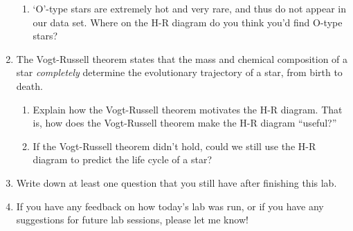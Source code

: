 \documentclass[11pt]{article}
\begin{document}
\begin{enumerate}
\begin{enumerate}
        \item `O'-type stars are extremely hot and very rare, and thus do not appear in our data set. Where on the H-R diagram do you think you'd find O-type stars?
    \end{enumerate}
    
    \item The Vogt-Russell theorem states that the mass and chemical composition of a star \emph{completely} determine the evolutionary trajectory of a star, from birth to death. 
    \begin{enumerate}
        \item Explain how the Vogt-Russell theorem motivates the H-R diagram. That is, how does the Vogt-Russell theorem make the H-R diagram ``useful?''
        
        \item If the Vogt-Russell theorem didn't hold, could we still use the H-R diagram to predict the life cycle of a star?
    \end{enumerate}
    
    \item Write down at least one question that you still have after finishing this lab.
    
    \item If you have any feedback on how today's lab was run, or if you have any suggestions for future lab sessions, please let me know!
    
    
\end{enumerate}
\end{document}
